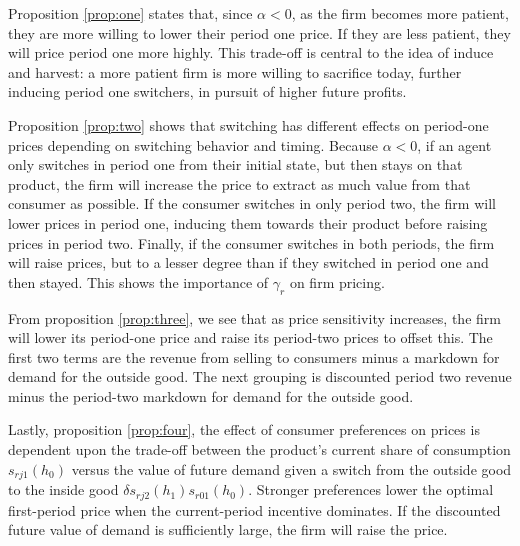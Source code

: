 Proposition \ref{prop:one} states that, since $\alpha < 0$, as the firm becomes more patient, they are more willing to
lower their period one price. If they are less patient, they will price period
one more highly. This trade-off is central to the idea of induce and harvest: a
more patient firm is more willing to sacrifice today, further inducing period
one switchers, in pursuit of higher future profits.

Proposition \ref{prop:two} shows that switching has different effects on
period-one prices depending on switching behavior and timing. Because
$\alpha<0$, if an agent only switches in period one from their initial state,
but then stays on that product, the firm will increase the price to extract as
much value from that consumer as possible. If the consumer switches in only
period two, the firm will lower prices in period one, inducing them towards
their product before raising prices in period two. Finally, if the consumer
switches in both periods, the firm will raise prices, but to a lesser degree
than if they switched in period one and then stayed. This shows the importance
of $\gamma_r$ on firm pricing. 

From proposition \ref{prop:three}, we see that as price sensitivity increases,
the firm will lower its period-one price and raise its period-two prices to
offset this. The first two terms are the revenue from selling to
consumers minus a markdown for demand for the outside good. The next grouping is
discounted period two revenue minus the period-two markdown for demand for the
outside good. 

Lastly, proposition \ref{prop:four}, the effect of consumer preferences on prices
is dependent upon the trade-off between the product's current share of
consumption $s_{rj1}(h_0)$ versus the value of future demand given a switch from
the outside good to the inside good $\delta s_{rj2}(h_1)s_{r01}(h_0)$. Stronger
preferences lower the optimal first-period price when the current-period
incentive dominates. If the discounted future value of demand is sufficiently
large, the firm will raise the price. 

